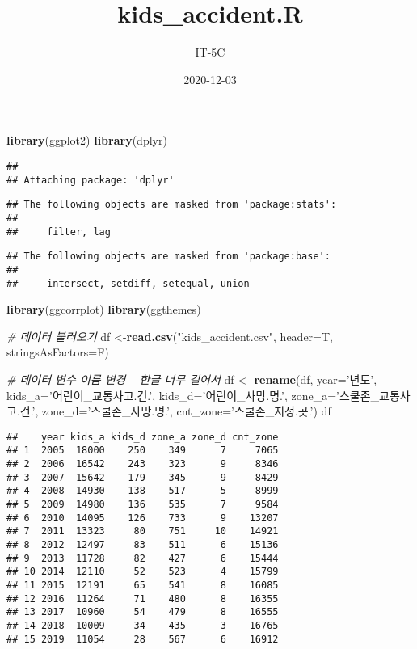 \documentclass[
]{article}
\title{kids\_accident.R}
\author{IT-5C}
\date{2020-12-03}
\newenvironment{Shaded}{\begin{snugshade}}{\end{snugshade}}
\newcommand{\CommentTok}[1]{\textcolor[rgb]{0.56,0.35,0.01}{\textit{#1}}}
\newcommand{\DataTypeTok}[1]{\textcolor[rgb]{0.13,0.29,0.53}{#1}}
\newcommand{\KeywordTok}[1]{\textcolor[rgb]{0.13,0.29,0.53}{\textbf{#1}}}
\newcommand{\NormalTok}[1]{#1}
\newcommand{\StringTok}[1]{\textcolor[rgb]{0.31,0.60,0.02}{#1}}
\begin{document}
\maketitle

\begin{Shaded}
\begin{Highlighting}[]
\KeywordTok{library}\NormalTok{(ggplot2)}
\KeywordTok{library}\NormalTok{(dplyr)}
\end{Highlighting}
\end{Shaded}

\begin{verbatim}
## 
## Attaching package: 'dplyr'
\end{verbatim}

\begin{verbatim}
## The following objects are masked from 'package:stats':
## 
##     filter, lag
\end{verbatim}

\begin{verbatim}
## The following objects are masked from 'package:base':
## 
##     intersect, setdiff, setequal, union
\end{verbatim}

\begin{Shaded}
\begin{Highlighting}[]
\KeywordTok{library}\NormalTok{(ggcorrplot)}
\KeywordTok{library}\NormalTok{(ggthemes)}

\CommentTok{# 데이터 불러오기}
\NormalTok{df <-}\KeywordTok{read.csv}\NormalTok{(}\StringTok{"kids_accident.csv"}\NormalTok{, }\DataTypeTok{header=}\NormalTok{T, }\DataTypeTok{stringsAsFactors=}\NormalTok{F)}

\CommentTok{# 데이터 변수 이름 변경 -- 한글 너무 길어서}
\NormalTok{df <-}\StringTok{ }\KeywordTok{rename}\NormalTok{(df, }\DataTypeTok{year=}\StringTok{'년도'}\NormalTok{, }\DataTypeTok{kids_a=}\StringTok{'어린이_교통사고.건.'}\NormalTok{, }\DataTypeTok{kids_d=}\StringTok{'어린이_사망.명.'}\NormalTok{,}
             \DataTypeTok{zone_a=}\StringTok{'스쿨존_교통사고.건.'}\NormalTok{, }\DataTypeTok{zone_d=}\StringTok{'스쿨존_사망.명.'}\NormalTok{, }\DataTypeTok{cnt_zone=}\StringTok{'스쿨존_지정.곳.'}\NormalTok{)}
\NormalTok{df}
\end{Highlighting}
\end{Shaded}

\begin{verbatim}
##    year kids_a kids_d zone_a zone_d cnt_zone
## 1  2005  18000    250    349      7     7065
## 2  2006  16542    243    323      9     8346
## 3  2007  15642    179    345      9     8429
## 4  2008  14930    138    517      5     8999
## 5  2009  14980    136    535      7     9584
## 6  2010  14095    126    733      9    13207
## 7  2011  13323     80    751     10    14921
## 8  2012  12497     83    511      6    15136
## 9  2013  11728     82    427      6    15444
## 10 2014  12110     52    523      4    15799
## 11 2015  12191     65    541      8    16085
## 12 2016  11264     71    480      8    16355
## 13 2017  10960     54    479      8    16555
## 14 2018  10009     34    435      3    16765
## 15 2019  11054     28    567      6    16912
\end{verbatim}
\end{document}
